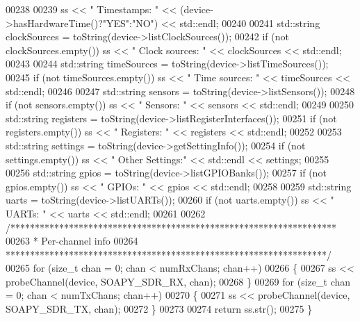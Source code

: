 \begin{DoxyCode}
00238 
00239     ss << \textcolor{stringliteral}{"  Timestamps: "} << (device->hasHardwareTime()?\textcolor{stringliteral}{"YES"}:\textcolor{stringliteral}{"NO"}) << std::endl;
00240 
00241     std::string clockSources = toString(device->listClockSources());
00242     \textcolor{keywordflow}{if} (not clockSources.empty()) ss << \textcolor{stringliteral}{"  Clock sources: "} << clockSources << std::endl;
00243 
00244     std::string timeSources = toString(device->listTimeSources());
00245     \textcolor{keywordflow}{if} (not timeSources.empty()) ss << \textcolor{stringliteral}{"  Time sources: "} << timeSources << std::endl;
00246 
00247     std::string sensors = toString(device->listSensors());
00248     \textcolor{keywordflow}{if} (not sensors.empty()) ss << \textcolor{stringliteral}{"  Sensors: "} << sensors << std::endl;
00249 
00250     std::string registers = toString(device->listRegisterInterfaces());
00251     \textcolor{keywordflow}{if} (not registers.empty()) ss << \textcolor{stringliteral}{"  Registers: "} << registers << std::endl;
00252 
00253     std::string settings = toString(device->getSettingInfo());
00254     \textcolor{keywordflow}{if} (not settings.empty()) ss << \textcolor{stringliteral}{"  Other Settings:"} << std::endl << settings;
00255 
00256     std::string gpios = toString(device->listGPIOBanks());
00257     \textcolor{keywordflow}{if} (not gpios.empty()) ss << \textcolor{stringliteral}{"  GPIOs: "} << gpios << std::endl;
00258 
00259     std::string uarts = toString(device->listUARTs());
00260     \textcolor{keywordflow}{if} (not uarts.empty()) ss << \textcolor{stringliteral}{"  UARTs: "} << uarts << std::endl;
00261 
00262     \textcolor{comment}{/*******************************************************************}
00263 \textcolor{comment}{     * Per-channel info}
00264 \textcolor{comment}{     ******************************************************************/}
00265     \textcolor{keywordflow}{for} (\textcolor{keywordtype}{size\_t} chan = 0; chan < numRxChans; chan++)
00266     \{
00267         ss << probeChannel(device, SOAPY_SDR_RX, chan);
00268     \}
00269     \textcolor{keywordflow}{for} (\textcolor{keywordtype}{size\_t} chan = 0; chan < numTxChans; chan++)
00270     \{
00271         ss << probeChannel(device, SOAPY_SDR_TX, chan);
00272     \}
00273 
00274     \textcolor{keywordflow}{return} ss.str();
00275 \}
\end{DoxyCode}
